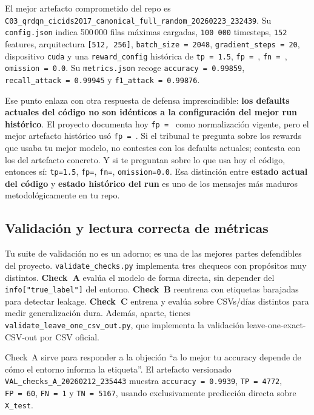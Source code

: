 ﻿\documentclass[12pt,a4paper]{article}
\begin{document}
El mejor artefacto comprometido del repo es
\texttt{C03\_qrdqn\_cicids2017\_canonical\_full\_random\_20260223\_232439}. Su \texttt{config.json}
indica 500\,000 filas máximas cargadas, \texttt{100\,000} timesteps, \texttt{152} features,
arquitectura \texttt{[512,~256]}, \texttt{batch\_size~=~2048}, \texttt{gradient\_steps~=~20},
dispositivo \texttt{cuda} y una \texttt{reward\_config} histórica de \texttt{tp~=~1.5},
\texttt{fp~=~}, \texttt{fn~=~}, \texttt{omission~=~0.0}. Su \texttt{metrics.json} recoge
\texttt{accuracy~=~0.99859}, \texttt{recall\_attack~=~0.99945} y \texttt{f1\_attack~=~0.99876}.

Ese punto enlaza con otra respuesta de defensa imprescindible: \textbf{los defaults actuales del
código no son idénticos a la configuración del mejor run histórico}. El proyecto documenta hoy
\texttt{fp~=~} como normalización vigente, pero el mejor artefacto histórico usó
\texttt{fp~=~}. Si el tribunal te pregunta sobre los rewards que usaba tu mejor
modelo, no contestes con los defaults actuales; contesta con los del artefacto concreto. Y si te
preguntan sobre lo que usa hoy el código, entonces sí: \texttt{tp=1.5}, \texttt{fp=},
\texttt{fn=}, \texttt{omission=0.0}. Esa distinción entre \textbf{estado actual del
código} y \textbf{estado
histórico del run} es uno de los mensajes más maduros metodológicamente en tu repo.

\subsection{Validación y lectura correcta de métricas}

Tu suite de validación no es un adorno; es una de las mejores partes defendibles del proyecto.
\verb|validate_checks.py| implementa tres chequeos con propósitos muy distintos. \textbf{Check~A}
evalúa el modelo de forma directa, sin depender del \texttt{info["true\_label"]} del entorno.
\textbf{Check~B} reentrena con etiquetas barajadas para detectar leakage. \textbf{Check~C} entrena y
evalúa sobre CSVs/días distintos para medir generalización dura. Además, aparte, tienes
\verb|validate_leave_one_csv_out.py|, que implementa la validación leave-one-exact-CSV-out por CSV
oficial.

Check~A sirve para responder a la objeción ``a lo mejor tu accuracy depende de cómo el entorno
informa la etiqueta''. El artefacto versionado \texttt{VAL\_checks\_A\_20260212\_235443} muestra
\texttt{accuracy~=~0.9939}, \texttt{TP~=~4772}, \texttt{FP~=~60}, \texttt{FN~=~1} y
\texttt{TN~=~5167}, usando exclusivamente predicción directa sobre \texttt{X\_test}.
\end{document}
